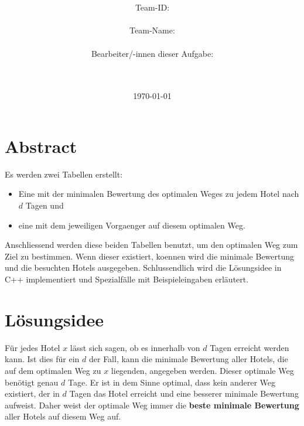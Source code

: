 \documentclass[a4paper,10pt,ngerman]{scrartcl}
\title{\textbf{\Huge\Aufgabe}}
\author{\LARGE Team-ID: \LARGE \TeamId \\\\
	    \LARGE Team-Name: \LARGE \TeamName \\\\
	    \LARGE Bearbeiter/-innen dieser Aufgabe: \\ 
	    \LARGE \Namen\\\\}
\date{\LARGE\today}
\begin{document}
\maketitle
\tableofcontents

\vspace{0.5cm}

\section{Abstract}
Es werden zwei Tabellen erstellt:
\begin{itemize}
    \item Eine mit der minimalen Bewertung des optimalen Weges zu jedem Hotel nach $d$ Tagen und
    \item eine mit dem jeweiligen Vorgaenger auf diesem optimalen Weg.
\end{itemize}
Anschliessend werden diese beiden Tabellen benutzt, um den optimalen Weg zum Ziel zu bestimmen.
Wenn dieser existiert, koennen wird die minimale Bewertung und die besuchten Hotels ausgegeben.
Schlussendlich wird die Lösungsidee in C++ implementiert und Spezialfälle mit Beispieleingaben erläutert.

\section{Lösungsidee}
Für jedes Hotel $x$ lässt sich sagen, ob es innerhalb von $d$ Tagen erreicht werden kann.
Ist dies für ein $d$ der Fall, kann die minimale Bewertung aller Hotels, die auf dem optimalen Weg zu $x$ liegenden, angegeben werden.
Dieser optimale Weg benötigt genau $d$ Tage.
Er ist in dem Sinne optimal, dass kein anderer Weg existiert, der in $d$ Tagen das Hotel erreicht und eine besserer minimale Bewertung aufweist.
Daher weist der optimale Weg immer die \textbf{beste minimale Bewertung} aller Hotels auf diesem Weg auf.
\end{document}
